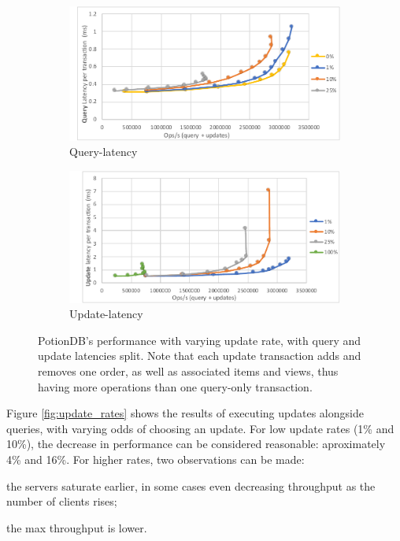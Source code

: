 \documentclass{vldb}
\begin{document}
\begin{figure}
	\centering
	\begin{subfigure}{.5\linewidth}
		\centering
		\includegraphics[width=.97\linewidth]{updRate_queryLatency_cut}
		\caption{Query-latency}
		\label{fig:update_rates_query}
	\end{subfigure}%
	\begin{subfigure}{.5\linewidth}
		\centering
		\includegraphics[width=.97\linewidth]{updRate_updateLatency_cut}
		\caption{Update-latency}
		\label{fig:update_rates_update}
	\end{subfigure}
	\caption{PotionDB's performance with varying update rate, with query and update latencies split. Note that each update transaction adds and removes one order, as well as associated items and views, thus having more operations than one query-only transaction.}
	\label{fig:update_rates_split}
\end{figure}

Figure \ref{fig:update_rates} shows the results of executing updates alongside queries, with varying odds of choosing an update.
For low update rates (1\% and 10\%), the decrease in performance can be considered reasonable: aproximately 4\% and 16\%.
For higher rates, two observations can be made:
\begin{enumerate*}[label=(\roman*)]
	\item the servers saturate earlier, in some cases even decreasing throughput as the number of clients rises;
	\item the max throughput is lower.
\end{enumerate*}
\end{document}
